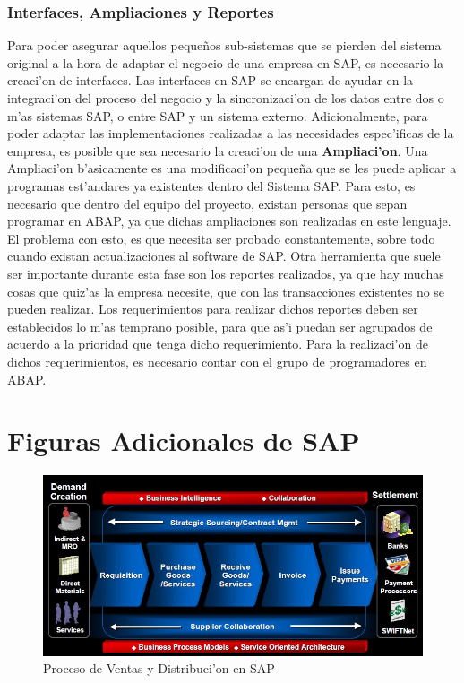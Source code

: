 \subsubsection{Interfaces, Ampliaciones y Reportes}

	Para poder asegurar aquellos peque\~nos sub-sistemas que se pierden del sistema original a la hora de adaptar el negocio de una empresa en SAP, es necesario la creaci'on de interfaces. Las interfaces en SAP se encargan de ayudar en la integraci'on del proceso del negocio y la sincronizaci'on de los datos entre dos o m'as sistemas SAP, o entre SAP y un sistema externo.
	Adicionalmente, para poder adaptar las implementaciones realizadas a las necesidades espec'ificas de la empresa, es posible que sea necesario la creaci'on de una \textbf{Ampliaci'on}. Una Ampliaci'on b'asicamente es una modificaci'on peque\~na que se les puede aplicar a programas est'andares ya existentes dentro del Sistema SAP. Para esto, es necesario que dentro del equipo del proyecto, existan personas que sepan programar en ABAP, ya que dichas ampliaciones son realizadas en este lenguaje. El problema con esto, es que necesita ser probado constantemente, sobre todo cuando existan actualizaciones al software de SAP. 
	Otra herramienta que suele ser importante durante esta fase son los reportes realizados, ya que hay muchas cosas que quiz'as la empresa necesite, que con las transacciones existentes no se pueden realizar.
	Los requerimientos para realizar dichos reportes deben ser establecidos lo m'as temprano posible, para que as'i puedan ser agrupados de acuerdo a la prioridad que tenga dicho requerimiento. Para la realizaci'on de dichos requerimientos, es necesario contar con el grupo de programadores en ABAP. 
	
	
\section{Figuras Adicionales de SAP}
\begin{figure}[H]
\centering
\includegraphics[scale=1.0,type=jpg,ext=.jpg,read=.jpg]{figures/salesFlow}
\caption{Proceso de Ventas y Distribuci'on en SAP}
\label{fig:salesFlow}
\end{figure}

